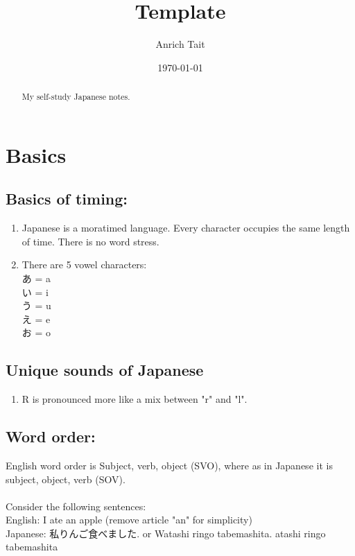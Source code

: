 \documentclass[12pt, letterpaper]{report}
\title{Template}
\author{Anrich Tait}
\date{\today}
\begin{document}
\restoregeometry %
\nopagecolor%

\tableofcontents
\begin{abstract}
My self-study Japanese notes.
\end{abstract}

\chapter{Basics}

\section{Basics of timing:}
\begin{enumerate}
	\item Japanese is a moratimed language. Every character occupies the same
		length of time. There is no word stress.
	\item There are 5 vowel characters: \\
		あ = a\\
		い = i\\
		う = u\\
		え = e\\
		お = o\\

\end{enumerate}

\section{Unique sounds of Japanese}
\begin{enumerate}
	\item R is pronounced more like a mix between "r" and "l".
\end{enumerate}

\clearpage
\section{Word order:}
	English word order is Subject, verb, object (SVO), where as in Japanese
		it is subject, object, verb (SOV).\\\\
			Consider the following sentences:\\
			English: I ate an apple (remove article "an" for simplicity)\\
			Japanese: 私りんご食べました. or Watashi ringo tabemashita. 
atashi ringo tabemashita
\end{document}

